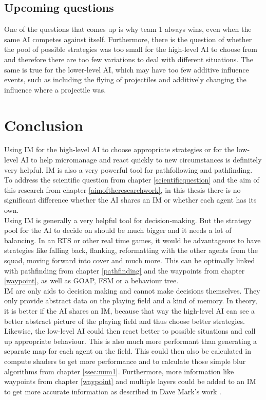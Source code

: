 \documentclass[]{report}
\begin{document}
		\section{Upcoming questions}
		One of the questions that comes up is why team 1 always wins, even when the same \ac{AI} competes against itself. Furthermore, there is the question of whether the pool of possible strategies was too small for the high-level \ac{AI} to choose from and therefore there are too few variations to deal with different situations. The same is true for the lower-level \ac{AI}, which may have too few additive influence events, such as including the flying of projectiles and additively changing the influence where a projectile was. 
		
		\chapter{Conclusion}
		Using \ac{IM} for the high-level \ac{AI} to choose appropriate strategies or for the low-level \ac{AI} to help micromanage and react quickly to new circumstances is definitely very helpful. \ac{IM} is also a very powerful tool for pathfollowing and pathfinding. \\
		
		To address the scientific question from chapter \ref{scientificquestion} and the aim of this research from chapter \ref{aimoftheresearchwork}, in this thesis there is no significant difference whether the \ac{AI} shares an \ac{IM} or whether each agent has its own. \\
		
		Using \ac{IM} is generally a very helpful tool for decision-making. But the strategy pool for the \ac{AI} to decide on should be much bigger and it needs a lot of balancing. In an \ac{RTS} or other real time games, it would be advantageous to have strategies like falling back, flanking, reformatting with the other agents from the squad, moving forward into cover and much more. This can be optimally linked with pathfinding from chapter \ref{pathfinding} and the waypoints from chapter \ref{waypoint}, as well as \ac{GOAP}, \ac{FSM} or a behaviour tree. \\
		
		\ac{IM} are only aids to decision making and cannot make decisions themselves. They only provide abstract data on the playing field and a kind of memory. In theory, it is better if the \ac{AI} shares an \ac{IM}, because that way the high-level \ac{AI} can see a better abstract picture of the playing field and thus choose better strategies. Likewise, the low-level \ac{AI} could then react better to possible situations and call up appropriate behaviour. This is also much more performant than generating a separate map for each agent on the field. This could then also be calculated in compute shaders to get more performance and to calculate those simple blur algorithms from chapter \ref{ssec:num1}. Furthermore, more information like waypoints from chapter \ref{waypoint} and multiple layers could be added to an \ac{IM} to get more accurate information as described in Dave Mark's work \citep{gameAIPro}. 
		
\end{document}
